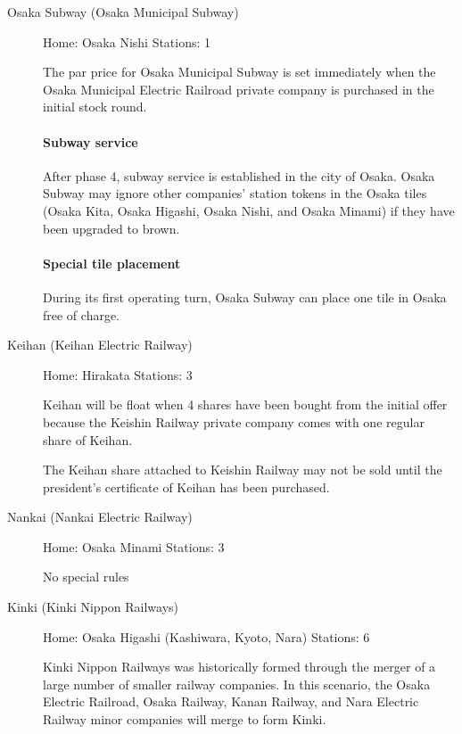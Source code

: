 \documentclass{article}
\begin{document}
\begin{CJK}{UTF8}{min}
\begin{multicols}{2}
\begin{description}
\item[Osaka Subway (Osaka Municipal Subway)] \hfill \label{osaka-subway}

Home: Osaka Nishi \hfill Stations: 1

The par price for Osaka Municipal Subway is set immediately when the
Osaka Municipal Electric Railroad private company is purchased in the
initial stock round.

\paragraph{Subway service}
After phase 4, subway service is established in the city of
Osaka. Osaka Subway may ignore other companies' station tokens in the
Osaka tiles (Osaka Kita, Osaka Higashi, Osaka Nishi, and Osaka Minami)
if they have been upgraded to brown.

\paragraph{Special tile placement}
During its first operating turn, Osaka Subway can place one tile in
Osaka free of charge.

\item[Keihan (Keihan Electric Railway)] \hfill

Home: Hirakata \hfill Stations: 3

Keihan will be float when 4 shares have been bought from the
initial offer because the Keishin Railway private company comes with
one regular share of Keihan.

The Keihan share attached to Keishin Railway may not be sold until the
president's certificate of Keihan has been purchased.

\item[Nankai (Nankai Electric Railway)] \hfill

Home: Osaka Minami \hfill Stations: 3

No special rules

\item[Kinki (Kinki Nippon Railways)] \hfill
\label{kinki}

Home: Osaka Higashi (Kashiwara, Kyoto, Nara) \hfill Stations: 6

Kinki Nippon Railways was historically formed through the merger of a
large number of smaller railway companies. In this scenario, the Osaka
Electric Railroad, Osaka Railway, Kanan Railway, and Nara Electric
Railway minor companies will merge to form Kinki.


\end{description}
\end{multicols}
\end{CJK}
\end{document}
